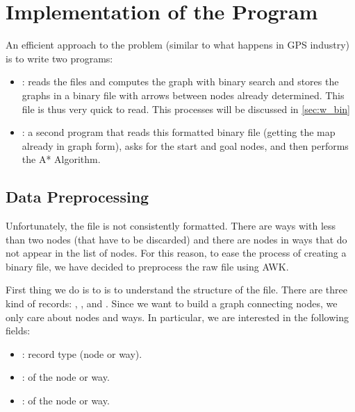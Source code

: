 \section{Implementation of the Program}\label{sec:implementation}

An efficient approach to the problem (similar to what happens in GPS industry) is to write two programs:
\begin{itemize}
	\item {}: reads the  files and computes the graph with binary search and stores the graphs in a binary file with arrows between nodes already determined. This file is thus very quick to read. This processes will be discussed in \cref{sec:w_bin}
	\item {}: a second program that reads this formatted binary file (getting the map already in graph form), asks for the start and goal nodes, and then performs the A* Algorithm.
\end{itemize}

\subsection{Data Preprocessing}
Unfortunately, the file is not consistently formatted. There are ways with less than two nodes (that have to be discarded) and there are nodes in ways that do not appear in the list of nodes. For this reason, to ease the process of creating a binary file, we have decided to preprocess the raw  file using AWK.

First thing we do is to is to understand the structure of the  file. There are three kind of records: , , and . Since we want to build a graph connecting nodes, we only care about nodes and ways. In particular, we are interested in the following fields:
\begin{itemize}
	\item {}: record type (node or way).
    \item {}:  of the node or way.
    \item {}:  of the node or way.
\end{itemize}

